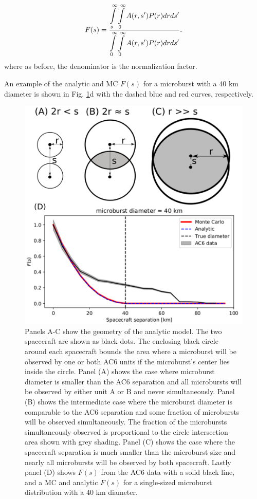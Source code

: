 \documentclass[draft]{agujournal2019}
\begin{document}
\begin{equation} \label{analytic_integral}
F(s) = \frac{\displaystyle\int\displaylimits_{s}^{\infty} \displaystyle\int\displaylimits_0^{\infty} A(r, s') P(r) dr ds'}{\displaystyle\int\displaylimits_{0}^{\infty} \displaystyle\int\displaylimits_0^{\infty} A(r, s') P(r) dr ds'} .
\end{equation} where as before, the denominator is the normalization factor.

An example of the analytic and MC $F(s)$ for a microburst with a 40 km diameter is shown in Fig. \ref{fig5}d with the dashed blue and red curves, respectively. 

\begin{figure}
\includegraphics[width=\textwidth]{fig5.png}
\caption{Panels A-C show the geometry of the analytic model. The two spacecraft are shown as black dots. The enclosing black circle around each spacecraft bounds the area where a microburst will be observed by one or both AC6 units if the microburst's center lies inside the circle. Panel (A) shows the case where microburst diameter is smaller than the AC6 separation and all microbursts will be observed by either unit A or B and never simultaneously. Panel (B) shows the intermediate case where the microburst diameter is comparable to the AC6 separation and some fraction of microbursts will be observed simultaneously. The fraction of the microbursts simultaneously observed is proportional to the circle intersection area shown with grey shading. Panel (C) shows the case where the spacecraft separation is much smaller than the microburst size and nearly all microbursts will be observed by both spacecraft. Lastly panel (D) shows $F(s)$ from the AC6 data with a solid black line, and a MC and analytic $F(s)$ for a single-sized microburst distribution with a 40 km diameter.} 
\label{fig5}
\end{figure}
\end{document}
